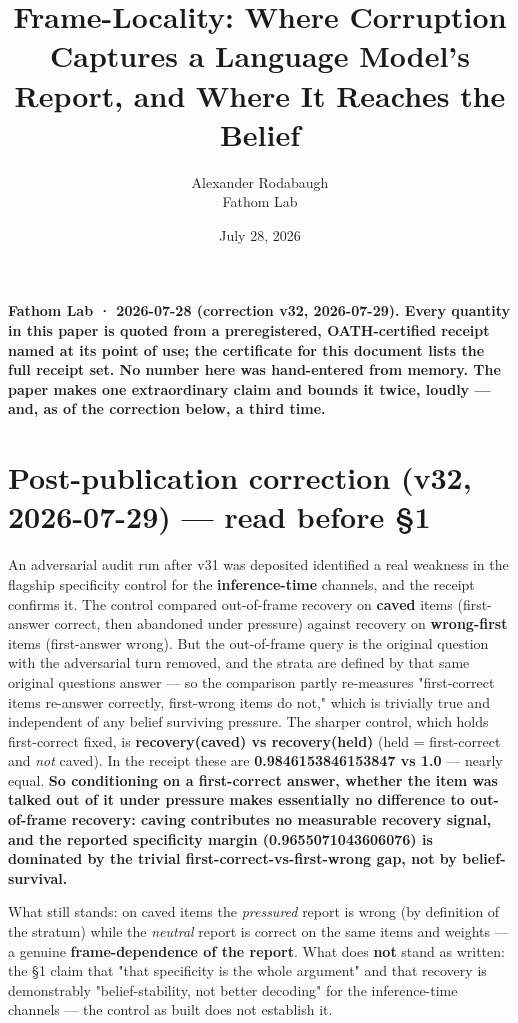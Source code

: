 \documentclass[11pt]{article}
\title{Frame-Locality: Where Corruption Captures a Language Model's Report, and Where It Reaches the Belief}
\author{Alexander Rodabaugh\\Fathom Lab}
\date{July 28, 2026}
\begin{document}
\maketitle
\textbf{Fathom Lab · 2026-07-28 (correction v32, 2026-07-29). Every quantity in this paper is quoted from a preregistered, OATH-certified receipt named at its point of use; the certificate for this document lists the full receipt set. No number here was hand-entered from memory. The paper makes one extraordinary claim and bounds it twice, loudly --- and, as of the correction below, a third time.}

\section{Post-publication correction (v32, 2026-07-29) --- read before §1}\label{post-publication-correction-v32-2026-07-29--read-before-1}

An adversarial audit run after v31 was deposited identified a real weakness in the flagship specificity control for the \textbf{inference-time} channels, and the receipt confirms it. The control compared out-of-frame recovery on \textbf{caved} items (first-answer correct, then abandoned under pressure) against recovery on \textbf{wrong-first} items (first-answer wrong). But the out-of-frame query is the original question with the adversarial turn removed, and the strata are defined by that same original question\textquotesingle s answer --- so the comparison partly re-measures "first-correct items re-answer correctly, first-wrong items do not," which is trivially true and independent of any belief surviving pressure. The sharper control, which holds first-correct fixed, is \textbf{recovery(caved) vs recovery(held)} (held = first-correct and \emph{not} caved). In the receipt these are \textbf{0.9846153846153847 vs 1.0} --- nearly equal. \textbf{So conditioning on a first-correct answer, whether the item was talked out of it under pressure makes essentially no difference to out-of-frame recovery: caving contributes no measurable recovery signal, and the reported specificity margin (0.9655071043606076) is dominated by the trivial first-correct-vs-first-wrong gap, not by belief-survival.}

What still stands: on caved items the \emph{pressured} report is wrong (by definition of the stratum) while the \emph{neutral} report is correct on the same items and weights --- a genuine \textbf{frame-dependence of the report}. What does \textbf{not} stand as written: the §1 claim that "that specificity is the whole argument" and that recovery is demonstrably "belief-stability, not better decoding" for the inference-time channels --- the control as built does not establish it.
\end{document}
